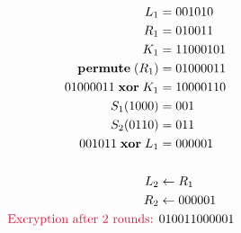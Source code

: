 \begin{Answer}
\begin{multicols}{2}
  \bigskip
  
  \begin{align*}
  L_{1} &= 001010\\
  R_{1} &= 010011\\
  K_{1} &= 11000101\\
  \perm{R_{1}} &= 01000011\\
  01000011 \xor K_{1} &= 10000110\\
  S_{1}(1000) &= 001\\
  S_{2}(0110) &= 011\\
  001011 \xor L_{1} &= 000001\\
  \\
  L_{2} &\gets R_{1}\\
  R_{2} &\gets 000001\\
  \text{\crim{Excryption after 2 rounds: }} &010011000001\\
  \end{align*}
  
  \end{multicols}
  
  \end{Answer}
